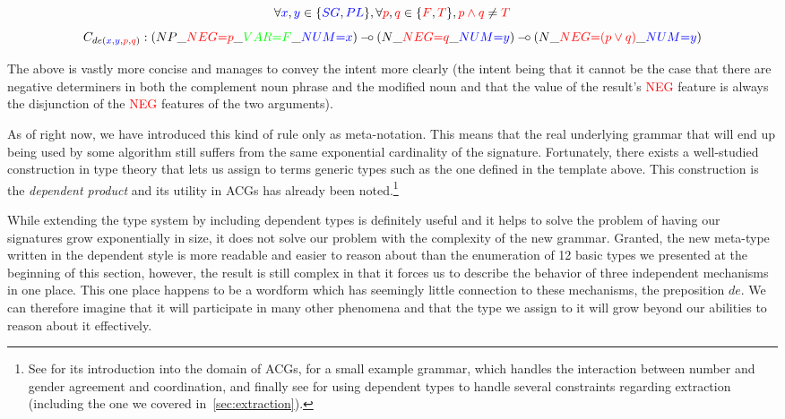 $$
\forall \textcolor{blue}{x}, \textcolor{blue}{y} \in\{\textcolor{blue}{SG}, \textcolor{blue}{PL}\}, \forall \textcolor{red}{p}, \textcolor{red}{q} \in \{\textcolor{red}{F}, \textcolor{red}{T}\}, \textcolor{red}{p \land q} \neq \textcolor{red}{T}
$$
$$
C_{de(\textcolor{blue}{x}, \textcolor{blue}{y}, \textcolor{red}{p}, \textcolor{red}{q})} : (NP\_\textcolor{red}{NEG{=}p}\_\textcolor{green}{VAR{=}F}\_\textcolor{blue}{NUM{=}x}) \mathbin{{-}\mkern-3.5mu{\circ}} (N\_\textcolor{red}{NEG{=}q}\_\textcolor{blue}{NUM{=}y}) \mathbin{{-}\mkern-3.5mu{\circ}} (N\_\textcolor{red}{NEG{=}(p \lor q)}\_\textcolor{blue}{NUM{=}y})
$$

The above is vastly more concise and manages to convey the intent more
clearly (the intent being that it cannot be the case that there are
negative determiners in both the complement noun phrase and the modified
noun and that the value of the result's \textcolor{red}{NEG} feature is
always the disjunction of the \textcolor{red}{NEG} features of the two
arguments).

As of right now, we have introduced this kind of rule only as
meta-notation. This means that the real underlying grammar that will end
up being used by some algorithm still suffers from the same exponential
cardinality of the signature. Fortunately, there exists a well-studied
construction in type theory that lets us assign to terms generic types
such as the one defined in the template above. This construction is the
\emph{dependent product} and its utility in ACGs has already been
noted.\footnote{See \cite{de2007two} for its introduction into the
  domain of ACGs, \cite{de2007type} for a small example grammar, which
  handles the interaction between number and gender agreement and
  coordination, and finally see \cite{pogodalla2012controlling} for
  using dependent types to handle several constraints regarding
  extraction (including the one we covered in~\ref{sec:extraction}).}

While extending the type system by including dependent types is
definitely useful and it helps to solve the problem of having our
signatures grow exponentially in size, it does not solve our problem
with the complexity of the new grammar. Granted, the new meta-type
written in the dependent style is more readable and easier to reason
about than the enumeration of 12 basic types we presented at the
beginning of this section, however, the result is still complex in
that it forces us to describe the behavior of three independent
mechanisms in one place. This one place happens to be a wordform which
has seemingly little connection to these mechanisms, the preposition
$de$. We can therefore imagine that it will participate in many other
phenomena and that the type we assign to it will grow beyond our
abilities to reason about it effectively.


